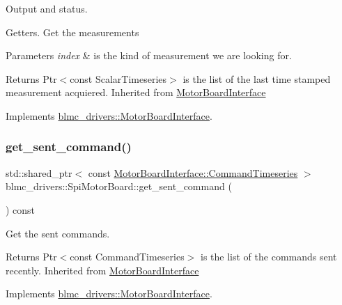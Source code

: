Output and status. 

Getters. Get the measurements


\begin{DoxyParams}{Parameters}
{\em index} & is the kind of measurement we are looking for. \\
\hline
\end{DoxyParams}
\begin{DoxyReturn}{Returns}
Ptr$<$const Scalar\+Timeseries$>$ is the list of the last time stamped measurement acquiered. Inherited from \hyperlink{classblmc__drivers_1_1MotorBoardInterface}{Motor\+Board\+Interface} 
\end{DoxyReturn}


Implements \hyperlink{classblmc__drivers_1_1MotorBoardInterface_a34828a0375a3bd1fede4deb4fc74c04d}{blmc\+\_\+drivers\+::\+Motor\+Board\+Interface}.

\mbox{\label{classblmc__drivers_1_1SpiMotorBoard_a4efe6ae858714de5cf5e54346fb6493c}} 
\subsubsection{\texorpdfstring{get\+\_\+sent\+\_\+command()}{get\_sent\_command()}}
{\footnotesize\ttfamily std\+::shared\+\_\+ptr$<$ const \hyperlink{classblmc__drivers_1_1MotorBoardInterface_ae2afe94a023d9f08a4c689e9b7660f15}{Motor\+Board\+Interface\+::\+Command\+Timeseries} $>$ blmc\+\_\+drivers\+::\+Spi\+Motor\+Board\+::get\+\_\+sent\+\_\+command (\begin{DoxyParamCaption}{ }\end{DoxyParamCaption}) const\hspace{0.3cm}{\ttfamily [virtual]}}



Get the sent commands. 

\begin{DoxyReturn}{Returns}
Ptr$<$const Command\+Timeseries$>$ is the list of the commands sent recently. Inherited from \hyperlink{classblmc__drivers_1_1MotorBoardInterface}{Motor\+Board\+Interface} 
\end{DoxyReturn}


Implements \hyperlink{classblmc__drivers_1_1MotorBoardInterface_afd3de58f7a900347154b8d323f1c1d94}{blmc\+\_\+drivers\+::\+Motor\+Board\+Interface}.

